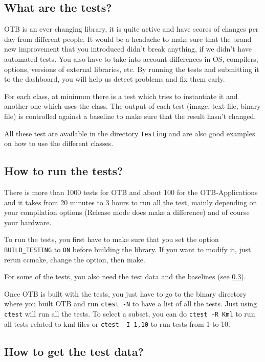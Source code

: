 \subsection{What are the tests?}

OTB is an ever changing library, it is quite active and have scores of
changes per day from different people. It would be a headache to make
sure that the brand new improvement that you introduced didn't break
anything, if we didn't have automated tests. You also have to take into
account differences in OS, compilers, options, versions of external
libraries, etc. By running the tests and submitting it to the dashboard,
you will help us detect problems and fix them early.

For each class, at minimum there is a test which tries to instantiate it and another one which uses the class. The output of each test (image, text file, binary file) is controlled against a baseline to make sure that the result hasn't changed.

All these test are available in the directory \texttt{Testing} and are also good examples on how to use the different classes.

\subsection{How to run the tests?}

There is more than 1000 tests for OTB and about 100 for the OTB-Applications and it takes from 20 minutes to 3 hours to run all the test, mainly depending on your compilation options (Release mode does make a difference) and of course your hardware.

To run the tests, you first have to make sure that you set the option \texttt{BUILD\_TESTING} to \texttt{ON} before building the library. If you want to modify it, just rerun ccmake, change the option, then make.

For some of the tests, you also need the test data and the baselines (see \ref{sec:FAQTestData}).

Once OTB is built with the tests, you just have to go to the binary directory where you built OTB and run \texttt{ctest -N} to have a list of all the tests. Just using \texttt{ctest} will run all the tests. To select a subset, you can do \texttt{ctest -R Kml} to run all tests related to kml files or \texttt{ctest -I 1,10} to run tests from 1 to 10.

\subsection{How to get the test data?}\label{sec:FAQTestData}

